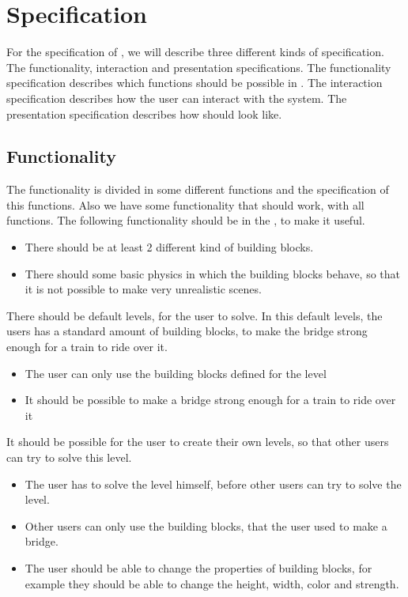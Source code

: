 \section{Specification}
For the specification of \name, we will describe three different kinds of specification. The functionality, interaction and presentation specifications. The functionality specification describes which functions should be possible in \name. The interaction specification describes how the user can interact with the system. The presentation specification describes how \name should look like. 
 \subsection{Functionality}
 The functionality is divided in some different functions and the specification of this functions. Also we have some functionality that should work, with all functions.
 The following functionality should be in the \name, to make it useful.
  \begin{itemize}
  \item There should be at least 2 different kind of building blocks. 
  \item There should some basic physics in which the building blocks behave, so that it is not possible to make very unrealistic scenes.
  \end{itemize}
  There should be default levels, for the user to solve. In this default levels, the users has a standard amount of building blocks, to make the bridge strong enough for a train to ride over it. 
 \begin{itemize}
 \item The user can only use the building blocks defined for the level
 \item It should be possible to make a bridge strong enough for a train to ride over it
 \end{itemize}
  It should be possible for the user to create their own levels, so that other users can try to solve this level. 
 \begin{itemize}
 \item The user has to solve the level himself, before other users can try to solve the level.
 \item Other users can only use the building blocks, that the user used to make a bridge.
 \item The user should be able to change the properties of building blocks, for example they should be able to change the height, width, color and strength.
 \end{itemize}

